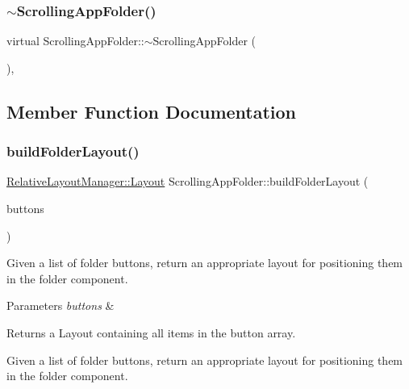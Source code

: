 \subsubsection{\texorpdfstring{$\sim$\+Scrolling\+App\+Folder()}{~ScrollingAppFolder()}}
{\footnotesize\ttfamily virtual Scrolling\+App\+Folder\+::$\sim$\+Scrolling\+App\+Folder (\begin{DoxyParamCaption}{ }\end{DoxyParamCaption})\hspace{0.3cm}{\ttfamily [inline]}, {\ttfamily [virtual]}}



\subsection{Member Function Documentation}
\mbox{\label{classScrollingAppFolder_a0ca4125e95f81e6ae5eee23e3040ab8c}} 
\subsubsection{\texorpdfstring{build\+Folder\+Layout()}{buildFolderLayout()}}
{\footnotesize\ttfamily \mbox{\hyperlink{classRelativeLayoutManager_a3dcd4cd0bc41754f3b4a64bc29b5eca5}{Relative\+Layout\+Manager\+::\+Layout}} Scrolling\+App\+Folder\+::build\+Folder\+Layout (\begin{DoxyParamCaption}\item[{Array$<$ \mbox{\hyperlink{classAppMenuButton_aeb692efb6a933970de8eac14e5e71544}{App\+Menu\+Button\+::\+Ptr}} $>$ \&}]{buttons }\end{DoxyParamCaption})\hspace{0.3cm}{\ttfamily [virtual]}}

Given a list of folder buttons, return an appropriate layout for positioning them in the folder component.


\begin{DoxyParams}{Parameters}
{\em buttons} & \\
\hline
\end{DoxyParams}
\begin{DoxyReturn}{Returns}
a Layout containing all items in the button array.
\end{DoxyReturn}
Given a list of folder buttons, return an appropriate layout for positioning them in the folder component. 

